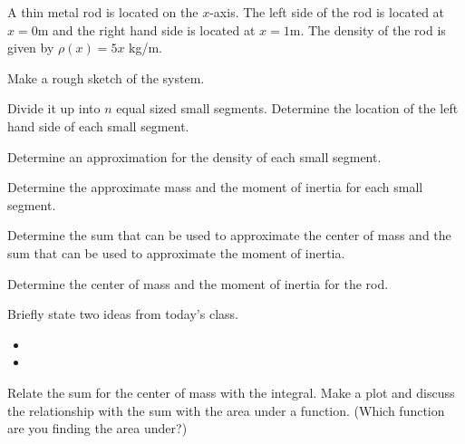 \begin{problem}
\item A thin metal rod is located on the $x$-axis. The left side of
  the rod is located at $x=0$m and the right hand side is located at
  $x=1$m. The density of the rod is given by $\rho(x)=5x$ kg/m.
  \begin{subproblem}
    \item Make a rough sketch of the system.
      \vfill
    \item Divide it up into $n$ equal sized small segments. Determine
      the location of the left hand side of each small segment.
      \vfill
    \item Determine an approximation for the density of each small
      segment.
      \vfill
    \item Determine the approximate mass and the moment of inertia for
      each small segment.  
      \vfill

      \clearpage

    \item Determine the sum that can be used to approximate the center
      of mass and the sum that can be used to approximate the moment
      of inertia.

      \vspace{5em}

    \item Determine the center of mass and the moment of inertia for
      the rod.

      \vfill

  \end{subproblem}
\end{problem}

\postClass

\begin{problem}
\item Briefly state two ideas from today's class.
  \begin{itemize}
  \item 
  \item 
  \end{itemize}
\item Relate the sum for the center of mass with the integral. Make a
  plot and discuss the relationship with the sum with the area under a
  function. (Which function are you finding the area under?)

  \vfill
\end{problem}



